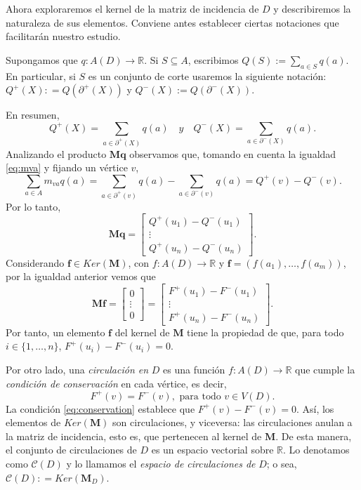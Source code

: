 Ahora exploraremos el kernel de la matriz de incidencia de $D$ y describiremos la naturaleza de sus elementos. Conviene antes establecer ciertas notaciones que facilitarán nuestro estudio. 

Supongamos que $q \colon A(D) \rightarrow \mathbb{R}$. Si $S\subseteq A$, escribimos $Q(S):= \sum_{a \in S} q(a)$. En particular, si $S$ es un conjunto de corte usaremos la siguiente notación: $Q^{+}(X): = Q(\partial^{+}(X))$ y $Q^{-}(X):=Q(\partial^{-}(X))$.
  
En resumen,
$$
Q^{+}(X) =  \sum_{a \in \partial^{+}(X)} q(a) \quad y \quad
Q^{-}(X) = \sum_{a \in \partial^{-}(X)} q(a). 
$$
Analizando el producto $\mathbf{M}\mathbf{q}$ observamos que, tomando en cuenta la igualdad \ref{eq:mva} y fijando un vértice $v$, 
$$
\sum_{a \in A} m_{va}q(a) = \sum_{a \in \partial^{+}(v)} q(a) - \sum_{a \in \partial^{-}(v)} q(a) = Q^{+}(v) - Q^{-}(v).
$$
Por lo tanto,
$$
\mathbf{M}\mathbf{q}=
    \begin{bmatrix}
Q^{+}(u_{1}) - Q^{-}(u_{1})\\ 
\vdots \\
Q^{+}(u_{n}) - Q^{-}(u_{n}) 
\end{bmatrix}.
$$
Considerando $\mathbf{f} \in Ker(\mathbf{M})$, con $f \colon A(D) \rightarrow \mathbb{R}$ y $\mathbf{f} = (f(a_{1}), \ldots, f(a_{m}))$, por la igualdad anterior vemos que 
$$
\mathbf{M}\mathbf{f}= 
\begin{bmatrix}
0 \\
\vdots\\
0
\end{bmatrix}= 
\begin{bmatrix}
F^{+}(u_{1}) - F^{-}(u_{1})\\
\vdots \\
F^{+}(u_{n}) - F^{-}(u_{n}) 
\end{bmatrix}.
$$
Por tanto, un elemento $\mathbf{f}$ del kernel de $\mathbf{M}$ tiene la propiedad de que, para todo $i \in \{1,\ldots, n\}$, $F^{+}(u_{i}) - F^{-}(u_{i}) = 0$.

Por otro lado, una \textit{circulación en} $D$ es una función $f \colon A(D) \rightarrow \mathbb{R}$ que cumple la \textit{condición de conservación} en cada vértice, es decir, 
\begin{equation} \label{eq:conservation}
    F^{+}(v) = F^{-}(v), \text{ para todo }v \in V(D).
\end{equation}
La condición \ref{eq:conservation} establece que $F^{+}(v) - F^{-}(v) = 0$. Así, los elementos de $Ker(\mathbf{M})$ son circulaciones, y viceversa: las circulaciones anulan a la matriz de incidencia, esto es, que pertenecen al kernel de $\mathbf{M}$. De esta manera, el conjunto de circulaciones de $D$ es un espacio vectorial sobre $\mathbb{R}$. Lo denotamos como $\mathcal{C}(D)$ y lo llamamos el \textit{espacio de circulaciones de} $D$; o sea, $\mathcal{C}(D) : = Ker(\mathbf{M}_{D})$. 


